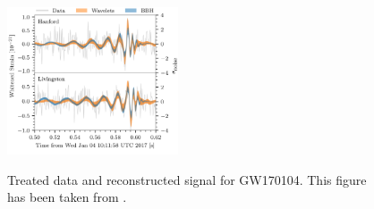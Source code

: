 \documentclass[%
reprint,
amsmath,amssymb,
aps,
]{revtex4-2}
\begin{document}
\begin{figure}[ht!]
	\includegraphics[width=0.45\textwidth]{Figures/GW170104_waveform_reconstructions.svg.png}
	\label{fig:GW170104Reconstructed}
	\caption{Treated data and reconstructed signal for GW170104. This figure has been taken from \cite{LIGOScientific:2017bnn}.}
\end{figure}
\end{document}

